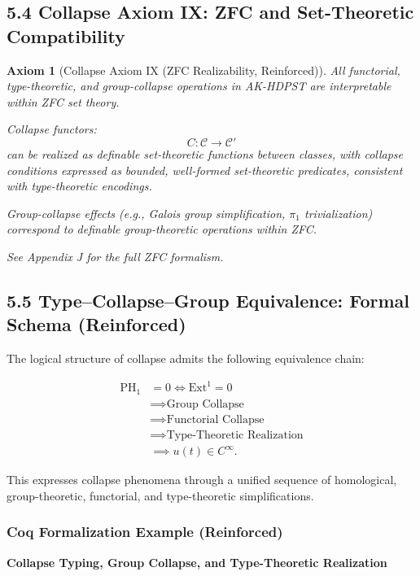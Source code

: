 \documentclass[11pt]{article}
\newtheorem{axiom}{Axiom}[section]
\begin{document}
\subsection*{5.4 Collapse Axiom IX: ZFC and Set-Theoretic Compatibility}

\begin{axiom}[Collapse Axiom IX (ZFC Realizability, Reinforced)]
All functorial, type-theoretic, and group-collapse operations in AK-HDPST are interpretable within ZFC set theory.

Collapse functors:
\[
C: \mathcal{C} \to \mathcal{C}'
\]
can be realized as definable set-theoretic functions between classes,  
with collapse conditions expressed as bounded, well-formed set-theoretic predicates, consistent with type-theoretic encodings.

Group-collapse effects (e.g., Galois group simplification, \(\pi_1\) trivialization) correspond to definable group-theoretic operations within ZFC.

See Appendix J for the full ZFC formalism.
\end{axiom}

\subsection*{5.5 Type–Collapse–Group Equivalence: Formal Schema (Reinforced)}

The logical structure of collapse admits the following equivalence chain:

\[
\begin{aligned}
\mathrm{PH}_1 &= 0 
\iff \mathrm{Ext}^1 = 0 \\
&\implies \text{Group Collapse} \\
&\implies \text{Functorial Collapse} \\
&\implies \text{Type-Theoretic Realization} \\
&\implies u(t) \in C^\infty.
\end{aligned}
\]


This expresses collapse phenomena through a unified sequence of homological, group-theoretic, functorial, and type-theoretic simplifications.

\subsubsection*{Coq Formalization Example (Reinforced)}

\begin{center}
\textbf{Collapse Typing, Group Collapse, and Type-Theoretic Realization}
\end{center}
\end{document}
